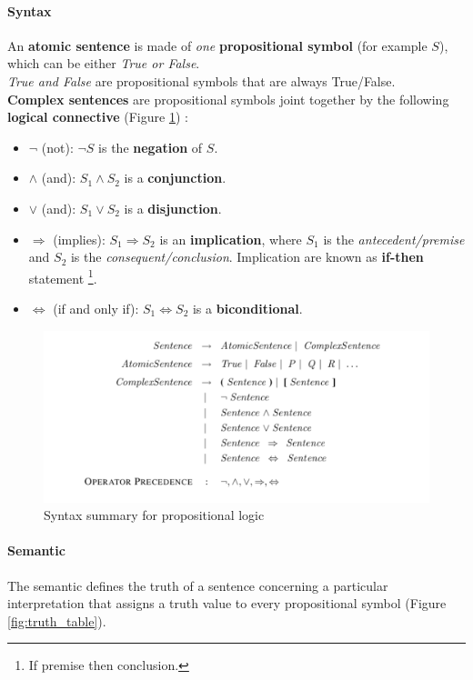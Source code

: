 \documentclass[10pt,a4paper]{article}
\begin{document}
\paragraph{Syntax}
\label{par:syntax}
An \textbf{atomic sentence} is made of \textit{one} \textbf{propositional symbol} (for example $S$), which can be either \textit{True or False}.\\
\textit{True and False} are propositional symbols that are always True/False.\\
\textbf{Complex sentences} are propositional symbols joint together by the following \textbf{logical connective} (Figure \ref{fig:prop_synt}) :
\begin{itemize}
\item $\neg$ (not): $\neg S$ is the \textbf{negation} of $S$.
\item $\wedge$ (and): $S_1\wedge S_2$ is a \textbf{conjunction}.
\item $\vee$ (and): $S_1\vee S_2$ is a \textbf{disjunction}.
\item $\Rightarrow$ (implies): $S_1\Rightarrow S_2$ is an \textbf{implication}, where $S_1$ is the \textit{antecedent/premise} and $S_2$ is the \textit{consequent/conclusion}. Implication are known as \textbf{if-then} statement \footnote{If premise then conclusion.}.
\item $\Leftrightarrow$ (if and only if): $S_1\Leftrightarrow S_2$ is a \textbf{biconditional}.
\end{itemize}

\begin{figure}[H]
\includegraphics[scale=0.7]{images/prop_syntax.png}
\caption{Syntax summary for propositional logic}
\label{fig:prop_synt}
\end{figure}

\paragraph{Semantic}
The semantic defines the truth of a sentence concerning a particular interpretation that assigns a truth value to every propositional symbol (Figure \ref{fig:truth_table}).
\end{document}

